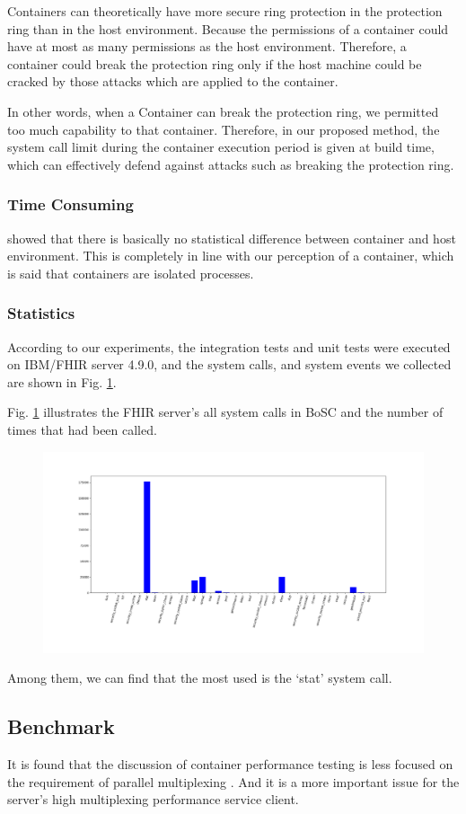 Containers can theoretically have more secure ring protection in the
protection ring than in the host environment. Because the permissions
of a container could have at most as many permissions as the host environment.
Therefore, a container could break the protection ring only if the host
machine could be cracked by those attacks which are applied to the container.

In other words, when a Container can break the protection ring, we permitted
too much capability to that container. Therefore, in our proposed method, the
system call limit during the container execution period is given at build time,
which can effectively defend against attacks such as breaking the protection ring.

\subsubsection{Time Consuming}
\textcite{KOZHIRBAYEV2017175} showed that there is basically no
statistical difference between container and host environment.
This is completely in line with our perception of a container,
which is said that containers are isolated processes.

\subsubsection{Statistics}
According to our experiments, the integration tests and unit
tests were executed on IBM/FHIR server 4.9.0, and the system calls,
and system events we collected are shown in Fig. \ref{hist}.

Fig. \ref{hist} illustrates the FHIR server's all system calls in
BoSC \cite{1495942} and the number of times that had been called.
\begin{figure}
    \centering
    \includegraphics[width=.5\textwidth]{src/hist.png}
    \label{hist}
\end{figure}
Among them, we can find that the most used is the `stat' system call.

\subsection{Benchmark}
It is found that the discussion of container performance testing is less
focused on the requirement of parallel multiplexing
\cite{7371699,KOZHIRBAYEV2017175,7095802,234857}. And it is a more
important issue for the server's high multiplexing performance service client.

